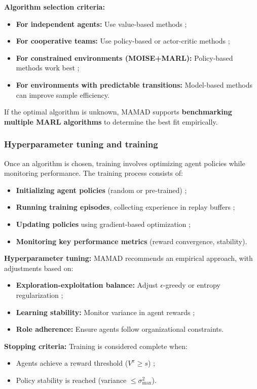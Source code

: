 \documentclass[journal]{IEEEtai}
\begin{document}
\noindent \textbf{Algorithm selection criteria:}
\begin{itemize}
    \item \textbf{For independent agents:} Use value-based methods ;
    \item \textbf{For cooperative teams:} Use policy-based or actor-critic methods ;
    \item \textbf{For constrained environments (MOISE+MARL):} Policy-based methods work best ;
    \item \textbf{For environments with predictable transitions:} Model-based methods can improve sample efficiency.
\end{itemize}

\noindent If the optimal algorithm is unknown, MAMAD supports \textbf{benchmarking multiple MARL algorithms} to determine the best fit empirically.

\subsubsection{Hyperparameter tuning and training}
Once an algorithm is chosen, training involves optimizing agent policies while monitoring performance. The training process consists of:
\begin{itemize}
    \item \textbf{Initializing agent policies} (random or pre-trained) ;
    \item \textbf{Running training episodes}, collecting experience in replay buffers ;
    \item \textbf{Updating policies} using gradient-based optimization ;
    \item \textbf{Monitoring key performance metrics} (reward convergence, stability).
\end{itemize}

\noindent \textbf{Hyperparameter tuning:}
MAMAD recommends an empirical approach, with adjustments based on:
\begin{itemize}
    \item \textbf{Exploration-exploitation balance:} Adjust $\epsilon$-greedy or entropy regularization ;
    \item \textbf{Learning stability:} Monitor variance in agent rewards ;
    \item \textbf{Role adherence:} Ensure agents follow organizational constraints.
\end{itemize}

\noindent \textbf{Stopping criteria:}
Training is considered complete when:
\begin{itemize}
    \item Agents achieve a reward threshold ($V^{\pi} \geq s$) ;
    \item Policy stability is reached (variance $\leq \sigma_{\max}^2$).
\end{itemize}
\end{document}
